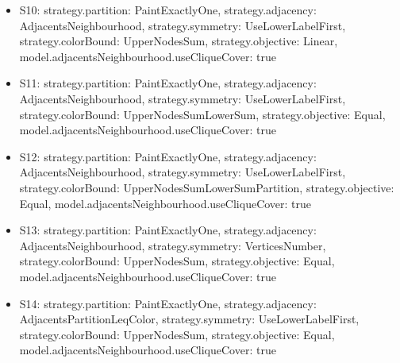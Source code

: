 \documentclass[landscape, 12pt]{report}
\begin{document}
\begin{itemize}
	\item S10: strategy.partition: PaintExactlyOne, strategy.adjacency: AdjacentsNeighbourhood, strategy.symmetry: UseLowerLabelFirst, strategy.colorBound: UpperNodesSum, strategy.objective: Linear, model.adjacentsNeighbourhood.useCliqueCover: true
	\item S11: strategy.partition: PaintExactlyOne, strategy.adjacency: AdjacentsNeighbourhood, strategy.symmetry: UseLowerLabelFirst, strategy.colorBound: UpperNodesSumLowerSum, strategy.objective: Equal, model.adjacentsNeighbourhood.useCliqueCover: true
	\item S12: strategy.partition: PaintExactlyOne, strategy.adjacency: AdjacentsNeighbourhood, strategy.symmetry: UseLowerLabelFirst, strategy.colorBound: UpperNodesSumLowerSumPartition, strategy.objective: Equal, model.adjacentsNeighbourhood.useCliqueCover: true
	\item S13: strategy.partition: PaintExactlyOne, strategy.adjacency: AdjacentsNeighbourhood, strategy.symmetry: VerticesNumber, strategy.colorBound: UpperNodesSum, strategy.objective: Equal, model.adjacentsNeighbourhood.useCliqueCover: true
	\item S14: strategy.partition: PaintExactlyOne, strategy.adjacency: AdjacentsPartitionLeqColor, strategy.symmetry: UseLowerLabelFirst, strategy.colorBound: UpperNodesSum, strategy.objective: Equal, model.adjacentsNeighbourhood.useCliqueCover: true
	\end{itemize}
\end{document}
